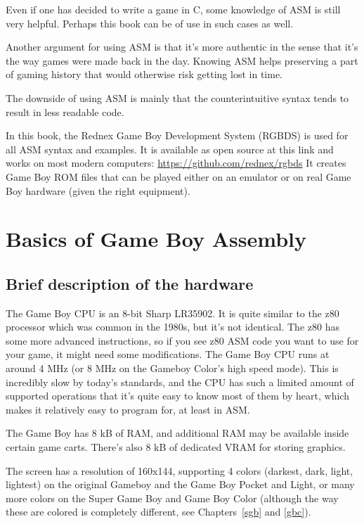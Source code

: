 \documentclass[11pt]{book}
\begin{document}
Even if one has decided to write a game in C, some knowledge of ASM is still very helpful. Perhaps this book can be of use in such cases as well.

Another argument for using ASM is that it's more authentic in the sense that it's the way games were made back in the day. Knowing ASM helps preserving a part of gaming history that would otherwise risk getting lost in time.

The downside of using ASM is mainly that the counterintuitive syntax tends to result in less readable code.

In this book, the Rednex Game Boy Development System (RGBDS) is used for all ASM syntax and examples. It is available as open source at this link and works on most modern computers: \url{https://github.com/rednex/rgbds}
It creates Game Boy ROM files that can be played either on an emulator or on real Game Boy hardware (given the right equipment).

\chapter{Basics of Game Boy Assembly}
\label{basics}

\section{Brief description of the hardware} 
\label{hardware}
The Game Boy CPU is an 8-bit Sharp LR35902. It is quite similar to the z80 processor which was common in the 1980s, but it's not identical. The z80 has some more advanced instructions, so if you see z80 ASM code you want to use for your game, it might need some modifications. The Game Boy CPU runs at around 4 MHz (or 8 MHz on the Gameboy Color's high speed mode). This is incredibly slow by today's standards, and the CPU has such a limited amount of supported operations that it's quite easy to know most of them by heart, which makes it relatively easy to program for, at least in ASM.

The Game Boy has 8 kB of RAM, and additional RAM may be available inside certain game carts. There's also 8 kB of dedicated VRAM for storing graphics. 

The screen has a resolution of 160x144, supporting 4 colors (darkest, dark, light, lightest) on the original Gameboy and the Game Boy Pocket and Light, or many more colors on the Super Game Boy and Game Boy Color (although the way these are colored is completely different, see Chapters~\ref{sgb} and \ref{gbc}). 
\end{document}
